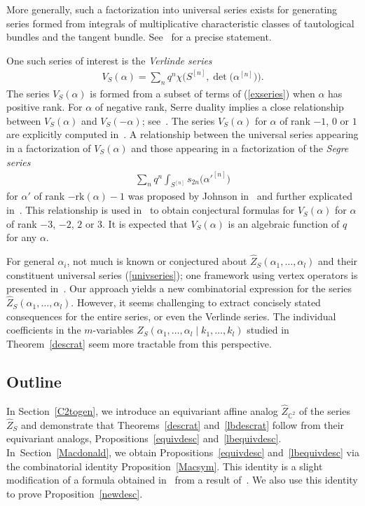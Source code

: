 \documentclass[pdftex]{sigma}
\numberwithin{equation}{section}
\def\C{\mathbb C}
\begin{document}
More generally, such a factorization into universal series exists for generating series formed from integrals of multiplicative characteristic classes of tautological bundles and the tangent bundle. See~\cite[Theorem~4.2]{EGL} for a precise statement.

One such series of interest is the {\em Verlinde series}
\begin{gather*}%
V_S(\alpha)= \sum_{n}q^{n}\chi\big(S^{[n]},\det\big(\alpha^{[n]}\big)\big).
\end{gather*}
The series $V_S(\alpha)$ is formed from a subset of terms of (\ref{exseries}) when $\alpha$ has positive rank. For $\alpha$ of negative rank, Serre duality implies a close relationship between $V_S(\alpha)$ and $V_S(-\alpha)$; see~\cite[Theorem~5.3]{EGL}. The series $V_S(\alpha)$ for $\alpha$ of rank $-1$, $0$ or $1$ are explicitly computed in~\cite[Theorem~5.3]{EGL}. A relationship between the universal series appearing in a factorization of $V_S(\alpha)$ and those appearing in a factorization of the {\em Segre series}
\begin{gather*}
\sum_n q^n\int_{S^{[n]}} s_{2n}\big(\alpha'^{[n]}\big)
\end{gather*}
for $\alpha'$ of rank $-\mathrm{rk}(\alpha)-1$ was proposed by Johnson in~\cite{J} and further explicated in~\cite[Conjecture 1]{MOP2}. This relationship is used in~\cite{MOP2, MOP3} to obtain conjectural formulas for $V_S(\alpha)$ for $\alpha$ of rank $-3$, $-2$, $2$ or $3$. It is expected that $V_S(\alpha)$ is an algebraic function of $q$ for any $\alpha$.

For general $\alpha_i$, not much is known or conjectured about $\hat{Z}_S(\alpha_1,\dots,\alpha_l)$ and their constituent universal series (\ref{univseries}); one framework using vertex operators is presented in~\cite{Z}. Our approach yields a new combinatorial expression for the series $\hat{Z}_S(\alpha_1,\dots,\alpha_l)$. However, it seems challenging to extract concisely stated consequences for the entire series, or even the Verlinde series. The individual coefficients in the $m$-variables $Z_S(\alpha_1,\dots,\alpha_l\mid k_1,\dots, k_l)$ studied in Theorem~\ref{descrat} seem more tractable from this perspective.


\subsection{Outline} In Section~\ref{C2togen}, we introduce an equivariant affine analog $\hat{Z}_{\C^2}$ of the series $\hat{Z}_S$ and demonstrate that Theorems~\ref{descrat} and~\ref{lbdescrat} follow from their equivariant analogs, Propositions~\ref{equivdesc} and~\ref{lbequivdesc}. In~Section~\ref{Macdonald}, we obtain Propositions~\ref{equivdesc} and~\ref{lbequivdesc} via the combinatorial identity Proposition~\ref{Macsym}. This identity is a slight modification of a formula obtained in~\cite{M} from a result of~\cite{GHT}. We also use this identity to prove Proposition~\ref{newdesc}.
\end{document}
